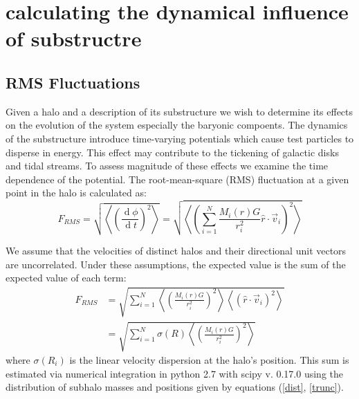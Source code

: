 \documentclass[usenatbib]{mnras}
\renewcommand{\d}[1]{\ensuremath{\operatorname{d}\!{#1}}}
\begin{document}
\section{calculating the dynamical influence of substructre}
\subsection{RMS Fluctuations}
Given a halo and a description of its substructure  we wish to determine its effects on the evolution of the system especially the baryonic compoents. The dynamics of the substructure introduce time-varying potentials which cause test particles to disperse in energy. This effect may contribute to the tickening of galactic disks and tidal streams. To assess magnitude of these effects we examine the time dependence of the potential. The root-mean-square (RMS) fluctuation at a given point in the halo is calculated as:
\begin{equation}
F_{RMS} = \sqrt{\left< \left( \frac{\d{\phi}}{\d{t}} \right)^2 \right>} = \sqrt{\left< \left(\sum_{i = 1}^N{\frac{M_i(r)G}{r_i^2} \hat{r} \cdot \vec{v}_i} \right)^2 \right>}
\end{equation}

	We assume that the velocities of distinct halos and their directional unit vectors are uncorrelated. Under these assumptions, the expected value is the sum of the expected value of each term:
\begin{align} \label{fluc}
F_{RMS} &= \sqrt{\sum_{i = 1}^N{\left< \left(\frac{M_i(r)G}{r_i^2}\right)^2 \right> \left< \left(\hat{r} \cdot \vec{v}_i \right)^2\right>}} \\ &= \sqrt{\sum_{i = 1}^N{\sigma(R) \left< \left(\frac{M_i(r)G}{r_i^2}\right)^2 \right>}} 
\end{align}  where $\sigma(R_i)$ is the linear velocity dispersion at the halo's position. This sum is estimated via numerical integration in python 2.7 with scipy v. 0.17.0 using the distribution of subhalo masses and positions given by equations (\ref{dist}, \ref{trunc}). 
 
\end{document}
